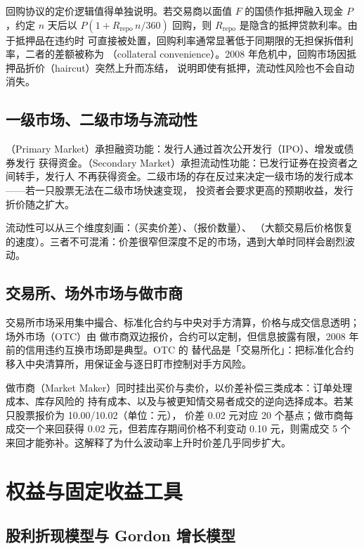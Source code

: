 回购协议的定价逻辑值得单独说明。若交易商以面值 $F$ 的国债作抵押融入现金 $P$，约定 $n$ 天后以
$P(1+R_{\text{repo}}\,n/360)$ 回购，则 $R_{\text{repo}}$ 是隐含的抵押贷款利率。由于抵押品在违约时
可直接被处置，回购利率通常显著低于同期限的无担保拆借利率，二者的差额被称为
（collateral convenience）。2008 年危机中，回购市场因抵押品折价（haircut）突然上升而冻结，
说明即使有抵押，流动性风险也不会自动消失。

\subsection{一级市场、二级市场与流动性}

（Primary Market）承担融资功能：发行人通过首次公开发行（IPO）、增发或债券发行
获得资金。（Secondary Market）承担流动性功能：已发行证券在投资者之间转手，发行人
不再获得资金。二级市场的存在反过来决定一级市场的发行成本——若一只股票无法在二级市场快速变现，
投资者会要求更高的预期收益，发行折价随之扩大。

流动性可以从三个维度刻画：（买卖价差）、（报价数量）、
（大额交易后价格恢复的速度）。三者不可混淆：价差很窄但深度不足的市场，遇到大单时同样会剧烈波动。

\subsection{交易所、场外市场与做市商}

交易所市场采用集中撮合、标准化合约与中央对手方清算，价格与成交信息透明；场外市场（OTC）由
做市商双边报价，合约可以定制，但信息披露有限，2008 年前的信用违约互换市场即是典型。OTC 的
替代品是「交易所化」：把标准化合约移入中央清算所，用保证金与逐日盯市控制对手方风险。

\begin{appbox}[做市商如何赚钱]
做市商（Market Maker）同时挂出买价与卖价，以价差补偿三类成本：订单处理成本、库存风险的
持有成本、以及与被更知情交易者成交的逆向选择成本。若某只股票报价为 10.00/10.02（单位：元），
价差 0.02 元对应 20 个基点；做市商每成交一个来回获得 0.02 元，但若库存期间价格不利变动
0.10 元，则需成交 5 个来回才能弥补。这解释了为什么波动率上升时价差几乎同步扩大。
\end{appbox}

\section{权益与固定收益工具}

\subsection{股利折现模型与 Gordon 增长模型}


